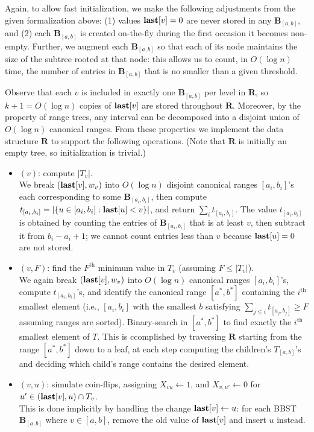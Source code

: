 Again, to allow fast initialization, we make the following adjustments from the given formalization above: (1) values $\mathbf{last}[v] = 0$ are never stored in any $\mathbf{B}_{[a,b]}$, and (2) each $\mathbf{B}_{[a,b]}$ is created on-the-fly during the first occasion it becomes non-empty. Further, we augment each $\mathbf{B}_{[a,b]}$ so that each of its node maintains the size of the subtree rooted at that node: this allows us to count, in $O(\log n)$ time, the number of entries in $\mathbf{B}_{[a,b]}$ that is no smaller than a given threshold.

Observe that each $v$ is included in exactly one $\mathbf{B}_{[a,b]}$ per level in $\mathbf{R}$, so $k+1=O(\log n)$ copies of $\mathbf{last}[v]$ are stored throughout $\mathbf{R}$. Moreover, by the property of range trees, any interval can be decomposed into a disjoint union of $O(\log n)$ canonical ranges. From these properties we implement the data structure $\mathbf{R}$ to support the following operations. (Note that $\mathbf{R}$ is initially an empty tree, so initialization is trivial.)
\begin{itemize}
\item {}$(v)$: compute $|T_v|$. \\
We break $(\mathbf{last}[v],w_v)$ into $O(\log n)$ disjoint canonical ranges $[a_i, b_i]$'s each corresponding to some $\mathbf{B}_{[a_i,b_i]}$, then compute $t_{[a_i,b_i]} =|\{u \in [a_i, b_i]: \mathbf{last}[u] < v\}|$, and return $\sum_i t_{[a_i,b_i]}$. The value $t_{[a_i, b_i]}$ is obtained by counting the entries of $\mathbf{B}_{[a_i, b_i]}$ that is at least $v$, then subtract it from $b_i-a_i+1$; we cannot count entries less than $v$ because $\mathbf{last}[u]=0$ are not stored.
\item {}$(v,F)$: find the $F^\textrm{th}$ minimum value in $T_v$ (assuming $F \leq |T_v|$). \\
We again break $(\mathbf{last}[v],w_v)$ into $O(\log n)$ canonical ranges $[a_i, b_i]$'s, compute $t_{[a_i, b_i]}$'s, and identify the canonical range $[a^*,b^*]$ containing the $i^\textrm{th}$ smallest element (i.e., $[a_i, b_i]$ with the smallest $b$ satisfying $\sum_{j \leq i} t_{[a_j,b_j]} \geq F$ assuming ranges are sorted). Binary-search in $[a^*,b^*]$ to find exactly the $i^\textrm{th}$ smallest element of $T$. This is ccomplished by traversing $\mathbf{R}$ starting from the range $[a^*,b^*]$ down to a leaf, at each step computing the children's $T_{[a,b]}$'s and deciding which child's range contains the desired element.
\item {}$(v,u)$: simulate coin-flips, assigning $X_{vu} \leftarrow 1$, and $X_{v,u'} \leftarrow 0$ for $u' \in (\mathbf{last}[v], u) \cap T_v$. \\
This is done implicitly by handling the change $\mathbf{last}[v] \leftarrow u$: for each BBST $\mathbf{B}_{[a,b]}$ where $v \in [a, b]$, remove the old value of $\mathbf{last}[v]$ and insert $u$ instead.
\end{itemize}
